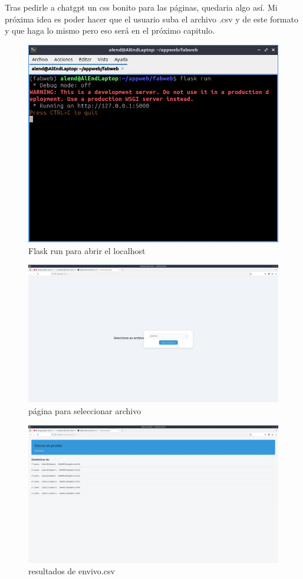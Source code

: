 \documentclass{article}
\begin{document}
Tras pedirle a chatgpt un css bonito para las páginas, quedaria algo así.
Mi próxima idea es poder hacer que el usuario suba el archivo .csv y de este formato y que haga lo mismo pero eso será en el próximo capitulo.

\begin{figure}
    \centering
    \includegraphics[width=0.5\linewidth]{Images/fabweb2.jpg}
    \caption{Flask run para abrir el localhost}
    \label{fig:enter-label}
\end{figure}

\begin{figure}
    \centering
    \includegraphics[width=0.5\linewidth]{Images/fabweb3.jpg}
    \caption{página para seleccionar archivo}
    \label{fig:enter-label}
\end{figure}

\begin{figure}
    \centering
    \includegraphics[width=0.5\linewidth]{Images/fabweb4.jpg}
    \caption{resultados de envivo.csv}
    \label{fig:enter-label}
\end{figure}
\end{document}
